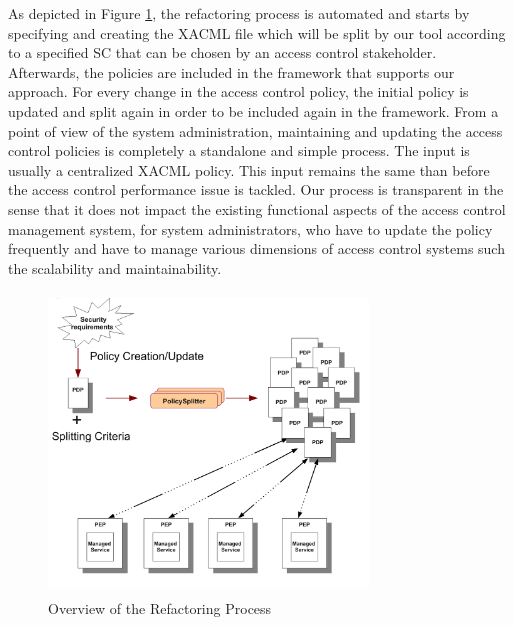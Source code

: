 As depicted in Figure \ref{overallprocess}, the refactoring process is automated and starts by specifying and creating the XACML file which 
will be split by our tool according to a specified SC that can be chosen by an access control stakeholder. Afterwards, the policies are included in the 
framework that supports our approach. For every change in the access control policy, the initial policy is updated and 
split again in order to be included again in the framework.
From a point of view of the system administration, maintaining and updating the access control policies is completely a standalone and simple
 process. The input is usually a centralized XACML policy. This input remains the same than before the access control performance issue is tackled.
Our process is transparent in the sense that it does not impact the existing functional aspects of the access control management system, 
for system administrators, who have to update the policy frequently and have to manage various dimensions of access control 
systems such the scalability and maintainability.
\begin{figure}[!h]
\begin{center}
\includegraphics[width=8.5cm, height=8cm]{Overall-process}
\caption{Overview of the Refactoring Process}
\label{overallprocess}
\end{center}
\end{figure} 
